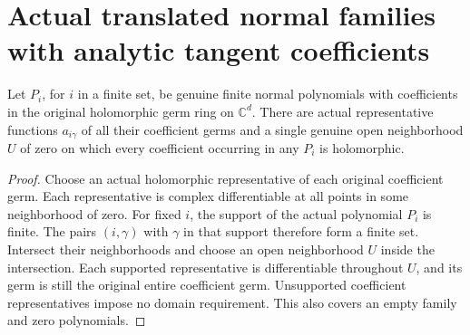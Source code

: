 \section{Actual translated normal families with analytic tangent coefficients}

\begin{theorem}
\label{hir:actual-finite-normal-polynomial-coefficient-domain}
\leanok
Let $P_i$, for $i$ in a finite set, be genuine finite normal polynomials
with coefficients in the original holomorphic germ ring on $\mathbb C^d$.
There are actual representative functions $a_{i\gamma}$ of all their
coefficient germs and a single genuine open neighborhood $U$ of zero
on which every coefficient occurring in any $P_i$ is holomorphic.
\end{theorem}
\begin{proof}
Choose an actual holomorphic representative of each original coefficient
germ. Each representative is complex differentiable at all points in
some neighborhood of zero. For fixed $i$, the support of the actual
polynomial $P_i$ is finite. The pairs $(i,\gamma)$ with $\gamma$ in that
support therefore form a finite set. Intersect their neighborhoods and
choose an open neighborhood $U$ inside the intersection. Each supported
representative is differentiable throughout $U$, and its germ is still
the original entire coefficient germ. Unsupported coefficient
representatives impose no domain requirement. This also covers an empty
family and zero polynomials.
\end{proof}

